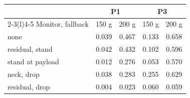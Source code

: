 \begin{tabular}{@{}lcccc@{}}
\toprule
 & \multicolumn{2}{c}{P1} & \multicolumn{2}{c}{P3}\\
\cmidrule(lr){2-3}\cmidrule(l){4-5}
Monitor, fallback & 150 g & 200 g & 150 g & 200 g\\
\midrule
none & 0.039 & 0.467 & 0.133 & 0.658\\
residual, stand & 0.042 & 0.432 & 0.102 & 0.596\\
stand at payload & 0.012 & 0.276 & 0.053 & 0.570\\
neck, drop & 0.038 & 0.283 & 0.255 & 0.629\\
residual, drop & 0.004 & 0.023 & 0.060 & 0.059\\
\bottomrule
\end{tabular}
